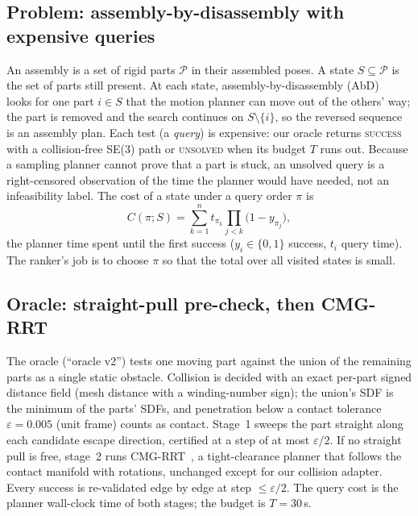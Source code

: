 \documentclass[conference]{IEEEtran}
\begin{document}
\subsection{Problem: assembly-by-disassembly with expensive queries}
An assembly is a set of rigid parts $\mathcal{P}$ in their assembled poses. A state $S\subseteq\mathcal{P}$ is the set
of parts still present. At each state, assembly-by-disassembly (AbD)~\cite{tian2022ata} looks for one part $i\in S$
that the motion planner can move out of the others' way; the part is removed and the search continues on
$S\setminus\{i\}$, so the reversed sequence is an assembly plan. Each test (a \emph{query}) is expensive: our oracle
returns \textsc{success} with a collision-free SE(3) path or \textsc{unsolved} when its budget $T$ runs out. Because a
sampling planner cannot prove that a part is stuck, an unsolved query is a right-censored observation of the time the
planner would have needed, not an infeasibility label. The cost of a state under a query order $\pi$ is
\begin{equation}
C(\pi;S)=\sum_{k=1}^{n} t_{\pi_k}\prod_{j<k}\bigl(1-y_{\pi_j}\bigr),
\label{eq:cost}
\end{equation}
the planner time spent until the first success ($y_i\in\{0,1\}$ success, $t_i$ query time). The ranker's job is to
choose $\pi$ so that the total over all visited states is small.

\subsection{Oracle: straight-pull pre-check, then CMG-RRT}
The oracle (``oracle v2'') tests one moving part against the union of the remaining parts as a single static
obstacle. Collision is decided with an exact per-part signed distance field (mesh distance with a winding-number
sign); the union's SDF is the minimum of the parts' SDFs, and penetration below a contact tolerance
$\varepsilon=0.005$ (unit frame) counts as contact. Stage~1 sweeps the part straight along each candidate escape
direction, certified at a step of at most $\varepsilon/2$. If no straight pull is free, stage~2 runs
CMG-RRT~\cite{livnat_cmgrrt}, a tight-clearance planner that follows the contact manifold with rotations, unchanged
except for our collision adapter. Every success is re-validated edge by edge at step $\le\varepsilon/2$. The query
cost is the planner wall-clock time of both stages; the budget is $T=30$\,s.
\end{document}
